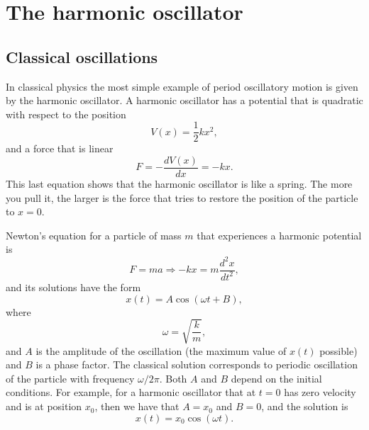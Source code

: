 \documentclass[../Main/chem331-notes.tex]{subfiles}
\begin{document}
\setcounter{section}{8}

\section{The harmonic oscillator}
\subsection{Classical oscillations}
In classical physics the most simple example of period oscillatory motion is given by the harmonic oscillator.
A harmonic oscillator has a potential that is quadratic with respect to the position
\begin{equation}
V(x) = \frac{1}{2} k x^2,
\end{equation}
and a force that is linear
\begin{equation}
F = -\frac{dV(x)}{dx} = -k x.
\end{equation}
This last equation shows that the harmonic oscillator is like a spring. The more you pull it, the larger is the force that tries to restore the position of the particle to $x = 0$.

Newton's equation for a particle of mass $m$ that experiences a harmonic potential is
\begin{equation}
F = ma \Rightarrow   - k x = m \frac{d^2 x}{dt^2},
\end{equation}
and its solutions have the form
\begin{equation}
x(t) = A \cos(\omega t + B),
\end{equation}
where 
\begin{equation}
\omega = \sqrt{\frac{k}{m}},
\end{equation}
and $A$ is the amplitude of the oscillation (the maximum value of $x(t)$ possible) and $B$ is a phase factor.
The classical solution corresponds to periodic oscillation of the particle with frequency $\omega / 2\pi$.
Both $A$ and $B$ depend on the initial conditions. For example, for a harmonic oscillator that at $t = 0$ has zero velocity and is at position $x_0$, then we have that $A = x_0$ and $B = 0$, and the solution is
\begin{equation}
x(t) = x_0 \cos(\omega t).
\end{equation}
\end{document}
